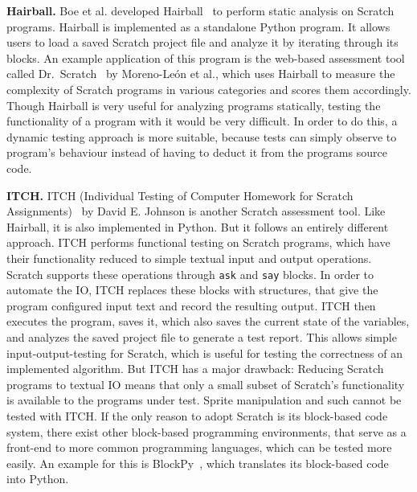 \textbf{Hairball.}
Boe et al. developed Hairball~\cite{hairball} to perform static analysis on Scratch programs.
Hairball is implemented as a standalone Python program.
It allows users to load a saved Scratch project file and analyze it by iterating through its blocks.
An example application of this program is the web-based assessment tool called Dr.\ Scratch~\cite{drscratch} by Moreno-Le\'on et al.,
which uses Hairball to measure the complexity of Scratch programs in various categories and scores them accordingly.
Though Hairball is very useful for analyzing programs statically, testing the functionality of a program with it would be very difficult.
In order to do this, a dynamic testing approach is more suitable, because tests can simply observe to program's behaviour instead of having to deduct it from the programs source code.
\parspace

\textbf{ITCH.}
ITCH (Individual Testing of Computer Homework for Scratch Assignments)~\cite{itch} by David E. Johnson is another Scratch assessment tool.
Like Hairball, it is also implemented in Python.
But it follows an entirely different approach.
ITCH performs functional testing on Scratch programs, which have their functionality reduced to simple textual input and output operations.
Scratch supports these operations through \texttt{ask} and \texttt{say} blocks.
In order to automate the IO, ITCH replaces these blocks with structures, that give the program configured input text and record the resulting output.
ITCH then executes the program, saves it, which also saves the current state of the variables, and analyzes the saved project file to generate a test report.
This allows simple input-output-testing for Scratch, which is useful for testing the correctness of an implemented algorithm.
But ITCH has a major drawback: Reducing Scratch programs to textual IO means that only a small subset of Scratch's functionality is available to the programs under test.
Sprite manipulation and such cannot be tested with ITCH.
If the only reason to adopt Scratch is its block-based code system, there exist other block-based programming environments, that serve as a front-end to more common programming languages, which can be tested more easily.
An example for this is BlockPy~\cite{blockpy}, which translates its block-based code into Python.


